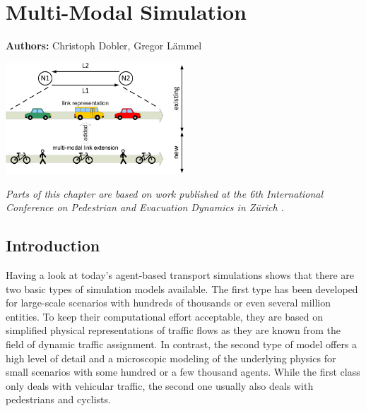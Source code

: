 \chapter{Multi-Modal Simulation}
\label{ch:multimodalsim}

\hfill \textbf{Authors:} Christoph Dobler, Gregor Lämmel

\begin{center} \includegraphics[width=0.5\textwidth, angle=0]{extending/figures/MultiModalSimulation/multi-modal-link-extension} \end{center}



\textit{Parts of this chapter are based on work published at the 6th International Conference on Pedestrian and Evacuation Dynamics in Zürich  \citep{DoblerLaemmel_PED_2012}}.

\section{Introduction}
Having a look at today's agent-based transport simulations shows that there are two basic types of simulation models available. The first type has been developed for large-scale scenarios with hundreds of thousands or even several million entities. To keep their computational effort acceptable, they are based on simplified physical representations of traffic flows as they are known from the field of dynamic traffic assignment. In contrast, the second type of model offers a high level of detail and a microscopic modeling of the underlying physics for small scenarios with some hundred or a few thousand agents. While the first class only deals with vehicular traffic, the second one usually also deals with pedestrians and cyclists.

